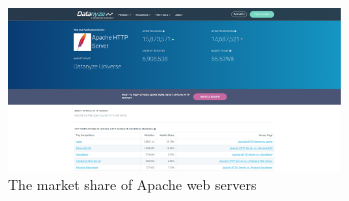 \begin{figure}[H] \label{the market share of Apache web servers}
    \centering
    \includegraphics[width=88mm,scale=0.8]{Apdenix/MarketshareApache.PNG}
    \caption{The market share of Apache web servers \cite{Apache}}
    \label{the market share of Apache web servers}
\end{figure}